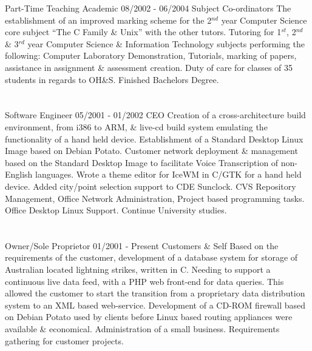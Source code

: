 \lskip
{} Part-Time Teaching Academic
 08/2002 - 06/2004
 Subject Co-ordinators
 The establishment of an improved marking scheme for the 2$^{nd}$ year Computer Science core subject ``The C Family \& Unix'' with the other tutors.
 Tutoring for 1$^{st}$, 2$^{nd}$ \& 3$^{rd}$ year Computer Science \& Information Technology subjects performing the following: Computer Laboratory Demonstration, Tutorials, marking of papers, assistance in assignment \& assessment creation.
\dashtopic Duty of care for classes of 35 students in regards to OH\&S.
 Finished Bachelors Degree.
\pskip

\section{\FST}

\lskip
{} Software Engineer
 05/2001 - 01/2002
 CEO
 Creation of a cross-architecture build environment, from i386 to ARM, \& live-cd build system emulating the functionality of a hand held device.
\dashtopic Establishment of a Standard Desktop Linux Image based on Debian {\mi Potato}.
\dashtopic Customer network deployment \& management based on the Standard Desktop Image to facilitate Voice Transcription of non-English languages.
\dashtopic Wrote a theme editor for IceWM in C/GTK for a hand held device.
\dashtopic Added city/point selection support to CDE Sunclock.
 CVS Repository Management, Office Network Administration, Project based programming tasks.
\dashtopic Office Desktop Linux Support.
 Continue University studies.
\pskip

\section{\dZN}

\lskip
{} Owner/Sole Proprietor
 01/2001 - Present
 Customers \& Self
 Based on the requirements of the customer, development of a database system for storage of Australian located lightning strikes, written in C. Needing to support a continuous live data feed, with a PHP web front-end for data queries. This allowed the customer to start the transition from a proprietary data distribution system to an XML based web-service.
\dashtopic Development of a CD-ROM firewall based on Debian {\mi Potato} used by clients before Linux based routing appliances were available \& economical.
 Administration of a small business.
\dashtopic Requirements gathering for customer projects.
\pskip

